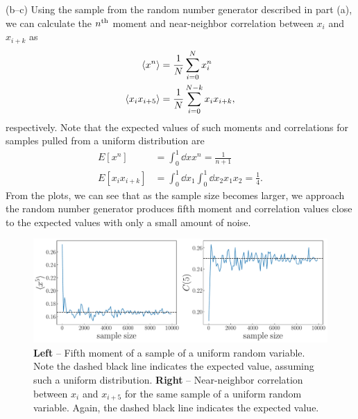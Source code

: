 {(b--c) Using the sample from the random number generator described in part (a), we can calculate the $n^{\rm th}$ moment and near-neighbor correlation between $x_{i}$ and $x_{i+k}$ as
\begin{align}
    \expval{x^{n}} &= \frac{1}{N} \sum_{i=0}^{N} x_{i}^{n} \\
    \expval{x_{i} x_{i+5}} &= \frac{1}{N} \sum_{i=0}^{N-k} x_{i} x_{i+k}
,\end{align}
respectively.
Note that the expected values of such moments and correlations for samples pulled from a uniform distribution are
\begin{align}
    E[x^{n}] &= \int_{0}^{1} \dd{x} x^{n} = \frac{1}{n+1} \\
    E[x_{i} x_{i+k}] &= \int_{0}^{1} \dd{x_1} \int_{0}^{1} \dd{x_2} x_{1} x_{2} = \frac{1}{4}
.\end{align}
From the plots, we can see that as the sample size becomes larger, we approach the random number generator produces fifth moment and correlation values close to the expected values with only a small amount of noise.

\begin{figure}[h!]
    \centering
    \includegraphics[width=\textwidth]{prob1_mom_corr.pdf}
    \caption{\textbf{Left} -- Fifth moment of a sample of a uniform random variable. Note the dashed black line indicates the expected value, assuming such a uniform distribution. \textbf{Right} -- Near-neighbor correlation between $x_{i}$ and $x_{i+5}$ for the same sample of a uniform random variable. Again, the dashed black line indicates the expected value.}
    \label{fig:prob1_mom-corr}
\end{figure}


}


